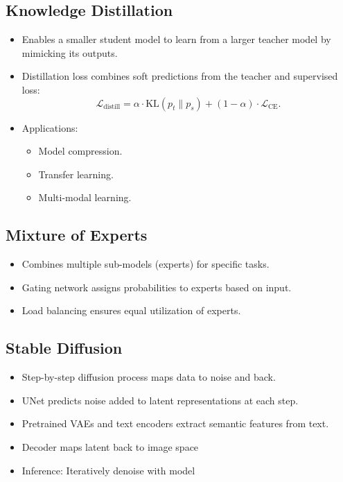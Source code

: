\documentclass[12pt,a4paper]{article}
\begin{document}
\subsection{Knowledge Distillation}
\begin{itemize}
    \item Enables a smaller student model to learn from a larger teacher model by mimicking its outputs.
    \item Distillation loss combines soft predictions from the teacher and supervised loss:
    \[ \mathcal{L}_{\text{distill}} = \alpha \cdot \text{KL}(p_t \| p_s) + (1 - \alpha) \cdot \mathcal{L}_{\text{CE}}. \]
    \item Applications:
    \begin{itemize}
        \item Model compression.
        \item Transfer learning.
        \item Multi-modal learning.
    \end{itemize}
\end{itemize}

\subsection{Mixture of Experts}
\begin{itemize}
    \item Combines multiple sub-models (experts) for specific tasks.
    \item Gating network assigns probabilities to experts based on input.
    \item Load balancing ensures equal utilization of experts.
\end{itemize}
\subsection{Stable Diffusion}
\begin{itemize}
    \item Step-by-step diffusion process maps data to noise and back.
    \item UNet predicts noise added to latent representations at each step.
    \item Pretrained VAEs and text encoders extract semantic features from text.
    \item Decoder maps latent back to image space 
    \item Inference: Iteratively denoise with model
\end{itemize}
\end{document}
